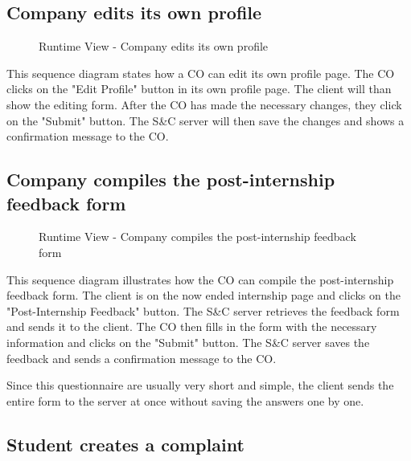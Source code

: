 \subsection{Company edits its own profile}
\label{sub:company-edits-its-own-profile}%

\begin{figure}[H]
      \centering
      \caption{Runtime View - Company edits its own profile}
      \label{fig:rv-co-edits-profile}
\end{figure}

\par This sequence diagram states how a CO can edit its own profile page. The CO clicks on the "Edit Profile" button 
in its own profile page. The client will than show the editing form. After the CO has made the necessary changes, 
they click on the "Submit" button. The S\&C server will then save the changes and shows a confirmation message to the 
CO.

\subsection{Company compiles the post-internship feedback form}
\label{sub:company-compiles-the-post-internship-feedback-form}%

\begin{figure}[H]
      \centering
      \caption{Runtime View - Company compiles the post-internship feedback form}
      \label{fig:rv-co-compiles-feedback-form}
\end{figure}

\par This sequence diagram illustrates how the CO can compile the post-internship feedback form. The client is on the 
now ended internship page and clicks on the "Post-Internship Feedback" button. The S\&C server retrieves the feedback 
form and sends it to the client. The CO then fills in the form with the necessary information and clicks on the 
"Submit" button. The S\&C server saves the feedback and sends a confirmation message to the CO.

\par Since this questionnaire are usually very short and simple, the client sends the entire form to the server at 
once without saving the answers one by one.

\subsection{Student creates a complaint}
\label{sub:student-creates-a-complaint}%


